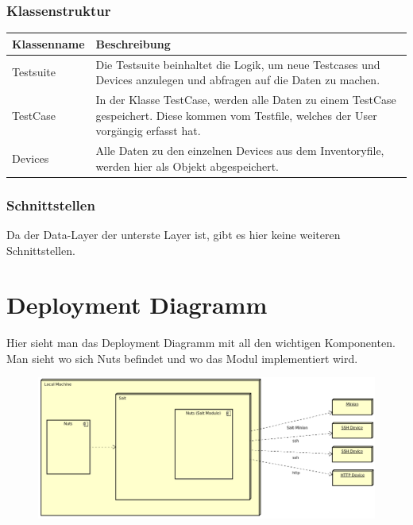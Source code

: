 \documentclass[a4,12pt]{scrartcl}
\begin{document}
\subsubsection{Klassenstruktur}
\begin{table}[H]
\centering
    \begin{tabular}{@{}l p{11cm} @{}}\toprule    
    {Klassenname} & {Beschreibung}\\ \midrule
    
    Testsuite & Die Testsuite beinhaltet die Logik, um neue Testcases und Devices anzulegen und abfragen auf die Daten zu machen.\\     
    TestCase & In der Klasse TestCase, werden alle Daten zu einem TestCase gespeichert. Diese kommen vom Testfile, welches der User vorgängig erfasst hat.\\         
    Devices & Alle Daten zu den einzelnen Devices aus dem Inventoryfile, werden hier als Objekt abgespeichert.\\
  
    \bottomrule
    \end{tabular}
\end{table}
\subsubsection{Schnittstellen}
Da der Data-Layer der unterste Layer ist, gibt es hier keine weiteren Schnittstellen.
\newpage
\section{Deployment Diagramm}
Hier sieht man das Deployment Diagramm mit all den wichtigen Komponenten. Man sieht wo sich Nuts befindet und wo das Modul implementiert wird.
\begin{figure} [H]
	\begin{center}
	\includegraphics[width=1\textwidth]{./pictures/DeploymentDiagram.png}
	\label{Bild Referenz}
	\end{center}
\end{figure}
\newpage
\end{document}
